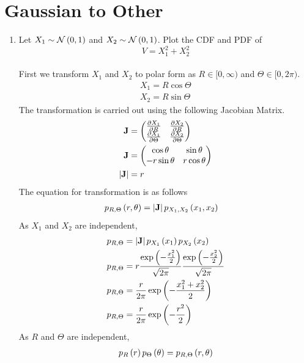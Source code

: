 \documentclass[journal,12pt,twocolumn]{IEEEtran}
\renewcommand\thesection{\arabic{section}}
\begin{document}
\section{Gaussian to Other}
\begin{enumerate}[label=\thesection.\arabic*
,ref=\thesection.\theenumi]
\item
Let $X_1 \sim  \mathcal{N}\left(0,1\right)$ and $X_2 \sim  \mathcal{N}\left(0,1\right)$. Plot the CDF and PDF of
%
\begin{equation}
V = X_1^2 + X_2^2
\end{equation}
\\
\solution First we transform $X_1$ and $X_2$ to polar form as  $R \in [0, \infty)$ and $\Theta \in [0, 2\pi)$.
\begin{align}
	X_1 = R \cos{\Theta} \\
	X_2 = R \sin{\Theta}
\end{align}
The transformation is carried out using the following Jacobian Matrix.
\begin{align}
	\mathbf{J} &= \begin{pmatrix}\frac{\partial X_1}{\partial R} &
					 \frac{\partial X_2}{\partial R} \\
					 \frac {\partial X_1}{\partial \Theta} &
					 \frac{\partial X_2}{\partial \Theta} \end{pmatrix}\\ 
	\mathbf{J} &= \begin{pmatrix}\cos{\theta} & \sin{\theta} \\
					  -r\sin{\theta} & r\cos{\theta}\end{pmatrix} \\
	\left\vert\mathbf{J}\right\vert &= r
	\label{eq:jacobian}
\end{align}
The equation for transformation is as follows
\begin{align}
	p_{R, \Theta}\left(r, \theta\right) &= \left\vert\mathbf{J}\right\vert p_{X_1, X_2}\left(x_1, x_2\right)
\end{align}
As $X_1$ and $X_2$ are independent,
\begin{align}
	 p_{R, \Theta} &= \left\vert\mathbf{J}\right\vert p_{X_1}\left(x_1\right)p_{X_2}\left(x_2\right)  \\
	 p_{R, \Theta} &= r \frac{ \exp{ \ensuremath{\left(-\frac{x_1^2}{2}\right)} } } {\sqrt{2\pi}}  
	 \frac{ \exp{ \ensuremath{\left(-\frac{x_2^2}{2}\right)} } } {\sqrt{2\pi}} \\
	 p_{R, \Theta} &= \frac{r}{2\pi}\exp{\ensuremath{\left(-\frac{x_1^2 + x_2^2}{2}\right)}} \\
	 p_{R, \Theta} &= \frac{r}{2\pi}\exp{\ensuremath{\left(-\frac{r^2}{2}\right)}}
\end{align}
As $R$ and $\Theta$ are independent,
\begin{align}
	p_R\brak{r} p_\Theta \brak{\theta} &= p_{R, \Theta}\brak{r, \theta} \\

\end{align}
\end{enumerate}
\end{document}
